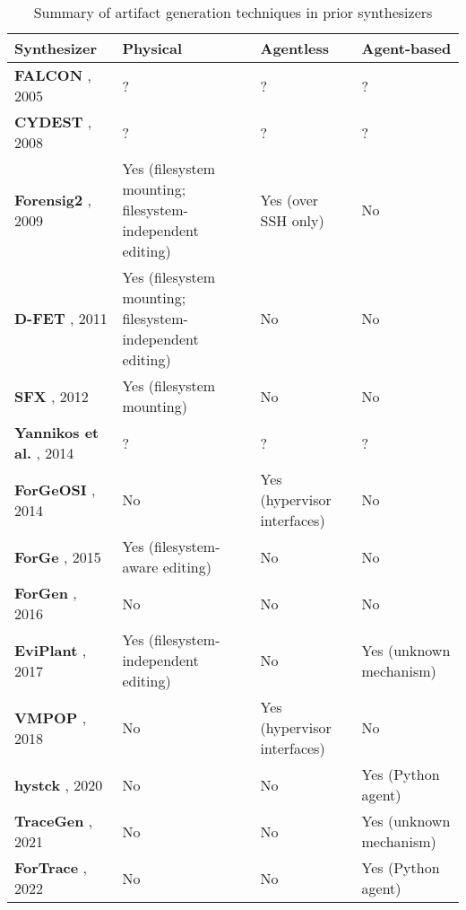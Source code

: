 \begin{table}[t]
\centering
\begin{tabular}{l l l l}
  \textbf{Synthesizer} & \textbf{Physical} & \textbf{Agentless} & \textbf{Agent-based} \\ \hline
  \textbf{FALCON} \cite{adelsteinAutomaticallyCreatingRealistic2005},
  2005 & ? & ? & ? \\
  \textbf{CYDEST} \cite{bruecknerAutomatedComputerForensics2008}, 2008
  & ? & ? & ? \\
  \textbf{Forensig2}
  \cite{mochForensicImageGenerator2009,mochEvaluatingForensicImage2012},
  2009 & Yes (filesystem mounting; filesystem-independent editing) & Yes
  (over SSH only) & No \\
  \textbf{D-FET} \cite{williamCloudbasedDigitalForensics2011}, 2011 &
  Yes (filesystem mounting; filesystem-independent editing) & No & No \\
  \textbf{SFX} \cite{russellForensicImageDescription2012}, 2012 & Yes
  (filesystem mounting) & No & No \\
  \textbf{Yannikos et al.} \cite{yannikosDataCorporaDigital2014}, 2014
  & ? & ? & ? \\
  \textbf{ForGeOSI} \cite{maxfraggMaxfraggForGeOSI2023}, 2014 & No &
  Yes (hypervisor interfaces) & No \\
  \textbf{ForGe} \cite{vistiAutomaticCreationComputer2015}, 2015 & Yes
  (filesystem-aware editing) & No & No \\
  \textbf{ForGen} \cite{jjk422Jjk422ForGen2019}, 2016 & No & No &
  No \\
  \textbf{EviPlant} \cite{scanlonEviPlantEfficientDigital2017}, 2017 &
  Yes (filesystem-independent editing) & No & Yes (unknown mechanism) \\
  \textbf{VMPOP} \cite{parkTREDEVMPOPCultivating2018}, 2018 & No & Yes
  (hypervisor interfaces) & No \\
  \textbf{hystck} \cite{gobelNovelApproachGenerating2020}, 2020 & No &
  No & Yes (Python agent) \\
  \textbf{TraceGen} \cite{duTraceGenUserActivity2021}, 2021 & No & No
  & Yes (unknown mechanism) \\
  \textbf{ForTrace} \cite{gobelForTraceHolisticForensic2022}, 2022 &
  No & No & Yes (Python agent) \\
\end{tabular}
\caption{Summary of artifact generation techniques in prior synthesizers}\label{tbl:prior-techniques}
\end{table}


